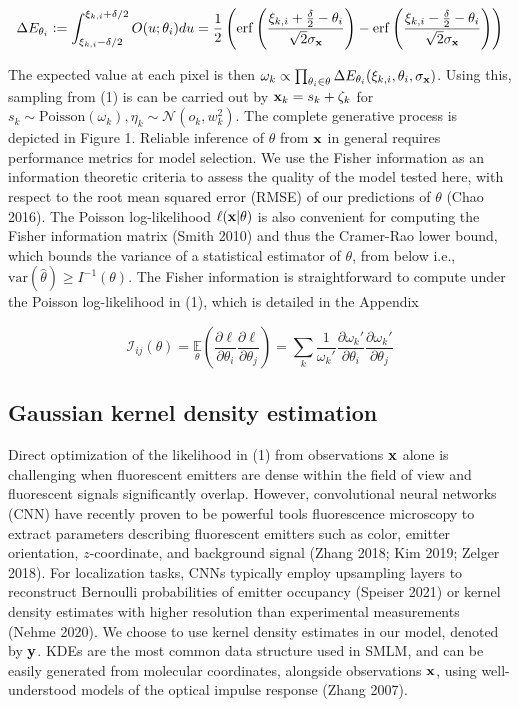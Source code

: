 \documentclass{article}
\begin{document}
\begin{equation}
\Delta E_{\theta_{i}} \vcentcolon = \int_{\xi_{k,i}-\delta /2}^{\xi_{k,i}+\delta /2} O(u;\theta_{i})du = \frac{1}{2}\left(\mathrm{erf}\left(\frac{\xi_{k,i}+\frac{\delta}{2}-\theta_{i}}{\sqrt{2}\sigma_{\bold{x}}}\right) -\mathrm{erf}\left(\frac{\xi_{k,i}-\frac{\delta}{2}-\theta_{i}}{\sqrt{2}\sigma_{\bold{x}}}\right)\right)
\end{equation}

The expected value at each pixel is then $\omega_{k}\propto \prod_{\theta_{i}\in \theta} \Delta E_{\theta_{i}}(\xi_{k,i},\theta_{i},\sigma_{\bold{x}}) $. Using this, sampling from (1) is can be carried out by $\bold{x}_{k} = s_{k} + \zeta_{k}$ for $s_{k}\sim \mathrm{Poisson}(\omega_{k}), \eta_{k}\sim \mathcal{N}(o_{k},w_{k}^{2})$. The complete generative process is depicted in Figure 1. Reliable inference of $\theta$ from $\bold{x}$ in general requires performance metrics for model selection. We use the Fisher information as an information theoretic criteria to assess the quality of the model tested here, with respect to the root mean squared error (RMSE) of our predictions of $\theta$ (Chao 2016). The Poisson log-likelihood $\ell(\bold{x}|\theta)$ is also convenient for computing the Fisher information matrix (Smith 2010) and thus the Cramer-Rao lower bound, which bounds the variance of a statistical estimator of $\theta$, from below i.e., $\mathrm{var}(\hat{\theta}) \geq I^{-1}(\theta)$. The Fisher information is straightforward to compute under the Poisson log-likelihood in (1), which is detailed in the Appendix

\begin{equation}
\mathcal{I}_{ij}(\theta) = \underset{\theta}{\mathbb{E}}\left(\frac{\partial \ell}{\partial\theta_{i}}\frac{\partial\ell}{\partial\theta_{j}}\right) = \sum_{k}\frac{1}{\omega_{k}'}\frac{\partial \omega_{k}'}{\partial\theta_{i}}\frac{\partial \omega_{k}'}{\partial\theta_{j}}
\end{equation}

\subsection{Gaussian kernel density estimation}

Direct optimization of the likelihood in (1) from observations $\bold{x}$ alone is challenging when fluorescent emitters are dense within the field of view and fluorescent signals significantly overlap. However, convolutional neural networks (CNN) have recently proven to be powerful tools fluorescence microscopy to extract parameters describing fluorescent emitters such as color, emitter orientation, $z$-coordinate, and background signal (Zhang 2018; Kim 2019; Zelger 2018). For localization tasks, CNNs typically employ upsampling layers to reconstruct Bernoulli probabilities of emitter occupancy (Speiser 2021) or kernel density estimates with higher resolution than experimental measurements (Nehme 2020). We choose to use kernel density estimates in our model, denoted by $\bold{y}$. KDEs are the most common data structure used in SMLM, and can be easily generated from molecular coordinates, alongside observations $\bold{x}$, using well-understood models of the optical impulse response (Zhang 2007). 
\end{document}
